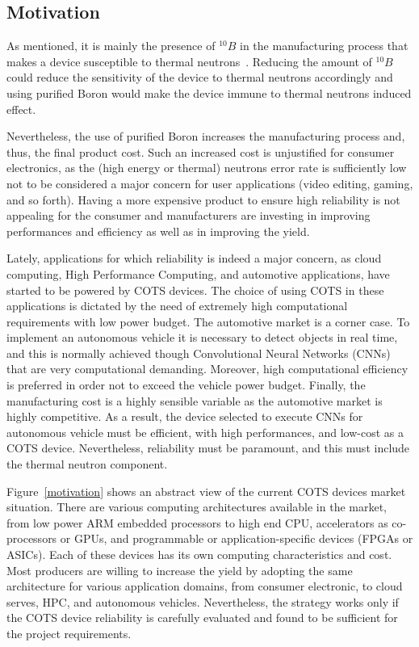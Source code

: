 \subsection{Motivation}
\label{sec_mot}

As mentioned, it is mainly the presence of $^{10}B$ in the manufacturing process that makes a device susceptible to thermal neutrons~\cite{wen2010b10}. Reducing the amount of $^{10}B$ could reduce the sensitivity of the device to thermal neutrons accordingly and using purified Boron would make the device immune to thermal neutrons induced effect.

Nevertheless, the use of purified Boron increases the manufacturing process and, thus, the final product cost. Such an increased cost is unjustified for consumer electronics, as the (high energy or thermal) neutrons error rate is sufficiently low not to be considered a major concern for user applications (video editing, gaming, and so forth). Having a more expensive product to ensure high reliability is not appealing for the consumer and manufacturers are investing in improving performances and efficiency as well as in improving the yield. 

Lately, applications for which reliability is indeed a major concern, as cloud computing, High Performance Computing, and automotive applications, have started to be powered by COTS devices. The choice of using COTS in these applications is dictated by the need of extremely high computational requirements with low power budget. The automotive market is a corner case. To implement an autonomous vehicle it is necessary to detect objects in real time, and this is normally achieved though Convolutional Neural Networks (CNNs) that are very computational demanding. Moreover, high computational efficiency is preferred in order not to exceed the vehicle power budget. Finally, the manufacturing cost is a highly sensible variable as the automotive market is highly competitive. As a result, the device selected to execute CNNs for autonomous vehicle must be efficient, with high performances, and low-cost as a COTS device. Nevertheless, reliability must be paramount, and this must include the thermal neutron component.

Figure~\ref{motivation} shows an abstract view of the current COTS devices market situation. There are various computing architectures available in the market, from low power ARM embedded processors to high end CPU, accelerators as co-processors or GPUs, and programmable or application-specific devices (FPGAs or ASICs). Each of these devices has its own computing characteristics and cost. Most producers are willing to increase the yield by adopting the same architecture for various application domains, from consumer electronic, to cloud serves, HPC, and autonomous vehicles. Nevertheless, the strategy works only if the COTS device reliability is carefully evaluated and found to be sufficient for the project requirements. 

